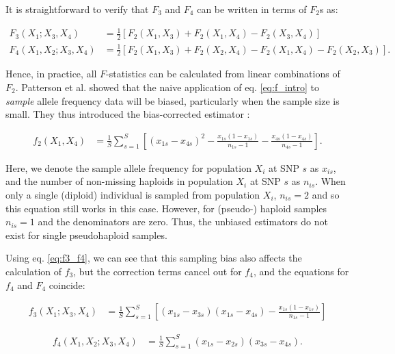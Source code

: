 \documentclass[12pt]{article}
\begin{document}
It is straightforward to verify that $F_3$ and $F_4$ can be written in terms of $F_2$s as:

\begin{align}\label{eq:f3_f4}
F_3(X_1;X_3,X_4) &= \frac{1}{2} [F_2(X_1,X_3) + F_2(X_1,X_4) - F_2(X_3,X_4)]\nonumber\\
F_4(X_1,X_2;X_3,X_4) &= \frac{1}{2} [F_2(X_1,X_3) + F_2(X_2,X_4) - F_2(X_1,X_4) - F_2(X_2,X_3)]\text{.}
\end{align}

Hence, in practice, all $F$-statistics can be calculated from linear combinations of $F_2$. Patterson et al. showed that the naive application of eq. \ref{eq:f_intro} to \emph{sample} allele frequency data will be biased, particularly when the sample size is small. They thus introduced the bias-corrected estimator \citep{ patterson_ancient_2012}:


\begin{align}\label{eq:f2_correction}
f_2(X_1,X_4) &= \frac{1}{S}\sum_{s=1}^S\left[(x_{1s} - x_{4s})^2 - \frac{x_{1s}(1-x_{1s})}{n_{1s}-1} - \frac{x_{4s}(1-x_{4s})}{n_{4s}-1}\right] \text{.}
\end{align}\label{eq:f2_error}

Here, we denote the sample allele frequency for population $X_i$ at SNP $s$ as $x_{is}$, and the number of non-missing haploids in population $X_i$ at SNP $s$ as $n_{is}$. When only a single (diploid) individual is sampled from population $X_i$, $n_{is}=2$ and so this equation still works in this case. However, for (pseudo-) haploid samples $n_{is}=1$ and the denominators are zero. Thus, the unbiased estimators do not exist for single pseudohaploid samples.

Using eq. \ref{eq:f3_f4}, we can see that this sampling bias also affects the calculation of $f_3$,  but the correction terms cancel out for $f_4$, and the equations for $f_4$ and $F_4$ coincide:

\begin{align}\label{eq:f3_correction}
f_3(X_1;X_3,X_4) &=\frac{1}{S} \sum_{s=1}^S\left[(x_{1s} - x_{3s})(x_{1s} - x_{4s}) - \frac{x_{1s}(1-x_{1s})}{n_{1s}-1}\right]
\end{align}\label{eq:f3_error} 

\begin{align}\label{eq:f4_correction}
f_4(X_1,X_2;X_3,X_4) &= \frac{1}{S}\sum_{s=1}^S(x_{1s} - x_{2s})(x_{3s} - x_{4s}) \text{.}
\end{align}\label{eq:f4_error} 
\end{document}
